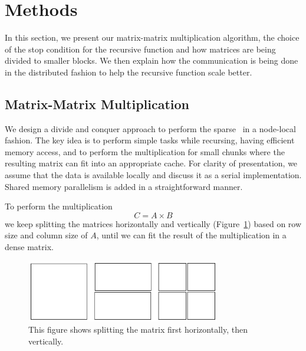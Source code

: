 \section{Methods}
\label{sec:methods}

In this section, we present our matrix-matrix multiplication algorithm, the choice of the stop condition for the recursive function and how matrices are being divided to smaller blocks. We then explain how the communication is being done in the distributed fashion to help the recursive function scale better.


\subsection{Matrix-Matrix Multiplication}
\label{sec:matmult}

We design a divide and conquer approach to perform the sparse \mm\ in a node-local fashion. The key idea is to perform simple tasks while recursing, having efficient memory access, and to perform the multiplication for small chunks where the resulting matrix can fit into an appropriate cache. For clarity of presentation, we assume that the data is available locally and discuss it as a serial implementation. Shared memory parallelism is added in a straightforward manner.

To perform the multiplication
\begin{equation}
    C = A \times B
\end{equation}
we keep splitting the matrices horizontally and vertically (Figure~\ref{fig:split2}) based on row size and column size of $A$, until we can fit the result of the multiplication in a dense matrix.

\begin{figure}[tbh]
 \centering
 \includegraphics[width=8.5cm,height=2.7cm]{./figures/split2.pdf}
 \caption{This figure shows splitting the matrix first horizontally, then vertically.}
 \label{fig:split2}
 \Description{}
\end{figure}

